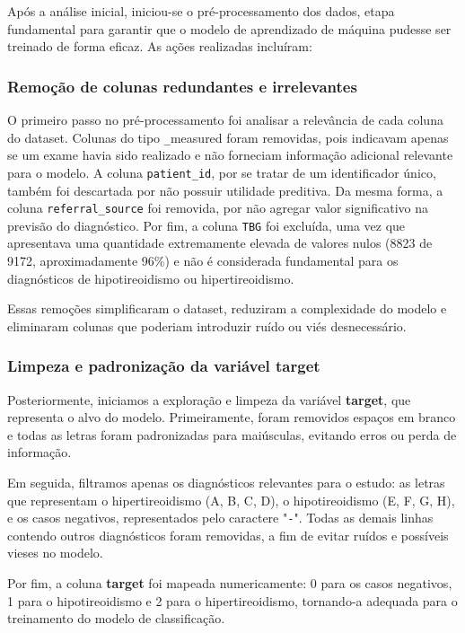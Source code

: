 \documentclass[11pt]{article}
\begin{document}
Após a análise inicial, iniciou-se o pré-processamento dos dados, etapa fundamental para garantir que o modelo de aprendizado de máquina pudesse ser treinado de forma eficaz. As ações realizadas incluíram:

\subsubsection{Remoção de colunas redundantes e irrelevantes}

O primeiro passo no pré-processamento foi analisar a relevância de cada coluna do dataset. Colunas do tipo \texttt*\_measured foram removidas, pois indicavam apenas se um exame havia sido realizado e não forneciam informação adicional relevante para o modelo. A coluna \texttt{patient\_id}, por se tratar de um identificador único, também foi descartada por não possuir utilidade preditiva. Da mesma forma, a coluna \texttt{referral\_source} foi removida, por não agregar valor significativo na previsão do diagnóstico. Por fim, a coluna \texttt{TBG} foi excluída, uma vez que apresentava uma quantidade extremamente elevada de valores nulos (8823 de 9172, aproximadamente 96\%) e não é considerada fundamental para os diagnósticos de hipotireoidismo ou hipertireoidismo.

Essas remoções simplificaram o dataset, reduziram a complexidade do modelo e eliminaram colunas que poderiam introduzir ruído ou viés desnecessário.

\subsubsection{Limpeza e padronização da variável target}

Posteriormente, iniciamos a exploração e limpeza da variável \textbf{target}, que representa o alvo do modelo. Primeiramente, foram removidos espaços em branco e todas as letras foram padronizadas para maiúsculas, evitando erros ou perda de informação.  

Em seguida, filtramos apenas os diagnósticos relevantes para o estudo: as letras que representam o hipertireoidismo (A, B, C, D), o hipotireoidismo (E, F, G, H), e os casos negativos, representados pelo caractere "\texttt{-}". Todas as demais linhas contendo outros diagnósticos foram removidas, a fim de evitar ruídos e possíveis vieses no modelo.  

Por fim, a coluna \textbf{target} foi mapeada numericamente: 0 para os casos negativos, 1 para o hipotireoidismo e 2 para o hipertireoidismo, tornando-a adequada para o treinamento do modelo de classificação.
\end{document}
